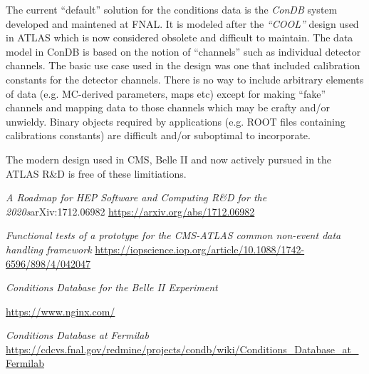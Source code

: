 \documentclass[pdftex,12pt,letter]{article}
\begin{document}
The current ``default'' solution for the conditions data is the \textit{ConDB} system developed and maintened
at FNAL. It is modeled after the \textit{``COOL''} design used in ATLAS which is now considered obsolete and difficult to
maintain. The data model in ConDB is based on the notion of ``channels'' such as individual detector channels.
The basic use case used in the design was one that included calibration constants for the detector channels.
There is no way to include arbitrary elements of data (e.g. MC-derived parameters, maps etc) except for making
``fake'' channels and mapping data to those channels which may be crafty and/or unwieldy. Binary objects
required by applications (e.g. ROOT files containing calibrations constants) are difficult and/or suboptimal
to incorporate.

The modern design used in CMS, Belle II and now actively pursued in the ATLAS R\&D is free of these limitiations.






\clearpage
\begin{thebibliography}{1}

{\textit{A Roadmap for HEP Software and Computing R\&D for the 2020s}arXiv:1712.06982} \url{https://arxiv.org/abs/1712.06982}

{\textit{Functional tests of a prototype for the CMS-ATLAS common non-event data handling framework}} \url{https://iopscience.iop.org/article/10.1088/1742-6596/898/4/042047}

{\textit{Conditions Database for the Belle II Experiment}}

{\url{https://www.nginx.com/}}

{\textit{Conditions Database at Fermilab}  \url{https://cdcvs.fnal.gov/redmine/projects/condb/wiki/Conditions_Database_at_Fermilab}}

\end{thebibliography}
\end{document}

